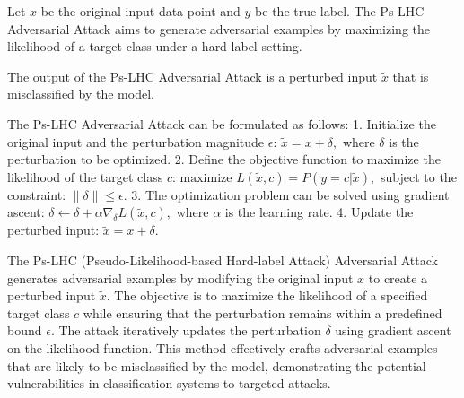 Let \( x \) be the original input data point and \( y \) be the true label. The Ps-LHC Adversarial Attack aims to generate adversarial examples by maximizing the likelihood of a target class under a hard-label setting.

The output of the Ps-LHC Adversarial Attack is a perturbed input \( \tilde{x} \) that is misclassified by the model.

The Ps-LHC Adversarial Attack can be formulated as follows:
1. Initialize the original input and the perturbation magnitude \( \epsilon \):
   $
   \tilde{x} = x + \delta,
   $
   where \( \delta \) is the perturbation to be optimized.
2. Define the objective function to maximize the likelihood of the target class \( c \):
   $
   \text{maximize } L(\tilde{x}, c) = P(y = c | \tilde{x}),
   $
   subject to the constraint:
   $
   \|\delta\| \leq \epsilon.
   $
3. The optimization problem can be solved using gradient ascent:
   $
   \delta \leftarrow \delta + \alpha \nabla_{\delta} L(\tilde{x}, c),
   $
   where \( \alpha \) is the learning rate.
4. Update the perturbed input:
   $
   \tilde{x} = x + \delta.
   $

The Ps-LHC (Pseudo-Likelihood-based Hard-label Attack) Adversarial Attack generates adversarial examples by modifying the original input \( x \) to create a perturbed input \( \tilde{x} \). The objective is to maximize the likelihood of a specified target class \( c \) while ensuring that the perturbation remains within a predefined bound \( \epsilon \). The attack iteratively updates the perturbation \( \delta \) using gradient ascent on the likelihood function. This method effectively crafts adversarial examples that are likely to be misclassified by the model, demonstrating the potential vulnerabilities in classification systems to targeted attacks.

